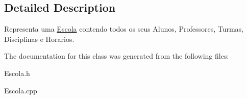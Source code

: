 \subsection{Detailed Description}
Representa uma \hyperlink{class_escola}{Escola} contendo todos os seus Alunos, Professores, Turmas, Disciplinas e Horarios. 

The documentation for this class was generated from the following files\-:\begin{DoxyCompactItemize}
\item 
Escola.\-h\item 
Escola.\-cpp\end{DoxyCompactItemize}
